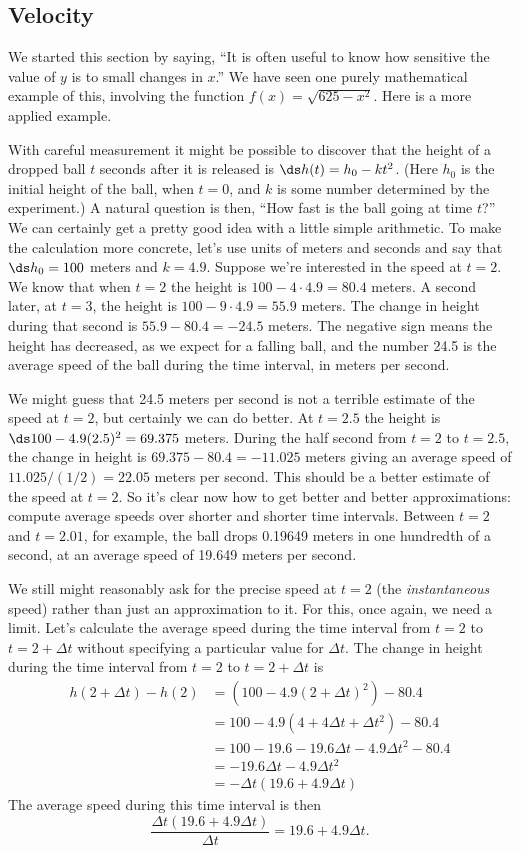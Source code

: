 \subsection*{Velocity}\label{sec:Velocity}

We started this section by saying, ``It is often useful to know
how sensitive the value of $y$ is to small changes in $x$.'' We have
seen one purely mathematical example of this, involving the function $f(x)=\sqrt{625-x^2}$. 
Here is a more applied example.

With careful measurement it might be possible to discover that the height of a
dropped ball $t$ seconds after it is released is $\ds h(t)=h_0-kt^2$. 
(Here $h_0$ is the initial height of the ball, when $t=0$,
and $k$ is some number determined by the experiment.)  A natural
question is then, ``How fast is the ball going at time $t$?'' We can
certainly get a pretty good idea with a little simple arithmetic. To
make the calculation more concrete, let's use units of meters and seconds and say that $\ds h_0=100$ meters and $k=4.9$.
Suppose we're interested in the speed at $t=2$. We know that when
$t=2$ the height is $100-4\cdot 4.9=80.4$ meters. A second later, at $t=3$,
the height is $100-9\cdot 4.9=55.9$ meters. The change in height during that second is
 $55.9-80.4=-24.5$ meters. The negative sign means the height has decreased, as we expect for a falling ball, and the number 24.5 is the average speed of the ball during the time interval, in meters per second.

We might guess that 24.5 meters per second is not a terrible estimate of the speed at
$t=2$, but certainly we can do better. At $t=2.5$ the height is
$\ds 100-4.9(2.5)^2=69.375$ meters. During the half second from $t=2$ to $t=2.5$, the change in height is
 $69.375-80.4=-11.025$ meters giving an average speed of 
$11.025/(1/2)=22.05$ meters per second. This should be a better estimate
of the speed at $t=2$. So it's clear now how to get better and better
approximations: compute average speeds over shorter and shorter time
intervals. Between $t=2$ and $t=2.01$, for example, the ball drops
0.19649 meters in one hundredth of a second, at an average speed of
19.649 meters per second.
 
We still might reasonably ask for the precise speed at $t=2$ (the {\em instantaneous} speed)
rather than just an approximation to it. For this, once again, we need a limit. Let's calculate
the average speed during the time interval from $t=2$ to $t=2+\Delta t$ without specifying a particular value for $\Delta t$.
The change in height during the time interval from $t=2$ to $t=2+\Delta t$ is
\begin{align*}
h(2+\Delta t)-h(2)
&=(100-4.9(2+\Delta t)^2)-80.4\\
&=100-4.9(4+4\Delta t+\Delta t^2)-80.4\\
&=100-19.6-19.6\Delta t-4.9\Delta t^2-80.4\\
&=-19.6\Delta t-4.9\Delta t^2\\
&=-\Delta t(19.6+4.9\Delta t)
\end{align*}
The average speed during this time interval is then
$$\frac{\Delta t(19.6+4.9\Delta t)}{\Delta t}=19.6+4.9\Delta t.$$

